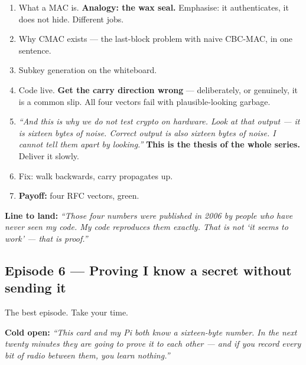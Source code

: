 \begin{enumerate}
  \item What a MAC is. \textbf{Analogy: the wax seal.} Emphasise: it
        authenticates, it does not hide. Different jobs.
  \item Why CMAC exists --- the last-block problem with naive CBC-MAC, in one
        sentence.
  \item Subkey generation on the whiteboard.
  \item Code  live. \textbf{Get the carry direction wrong} ---
        deliberately, or genuinely, it is a common slip. All four vectors fail
        with plausible-looking garbage.
  \item \emph{``And this is why we do not test crypto on hardware. Look at that
        output --- it is sixteen bytes of noise. Correct output is also sixteen
        bytes of noise. I cannot tell them apart by looking.''}
        \textbf{This is the thesis of the whole series.} Deliver it slowly.
  \item Fix: walk backwards, carry propagates up.
  \item \textbf{Payoff:} four RFC vectors, green.
\end{enumerate}

\textbf{Line to land:} \emph{``Those four numbers were published in 2006 by
people who have never seen my code. My code reproduces them exactly. That is not
`it seems to work' --- that is proof.''}

\subsection{Episode 6 --- Proving I know a secret without sending it}

The best episode. Take your time.

\textbf{Cold open:} \emph{``This card and my Pi both know a sixteen-byte number.
In the next twenty minutes they are going to prove it to each other --- and if
you record every bit of radio between them, you learn nothing.''}

